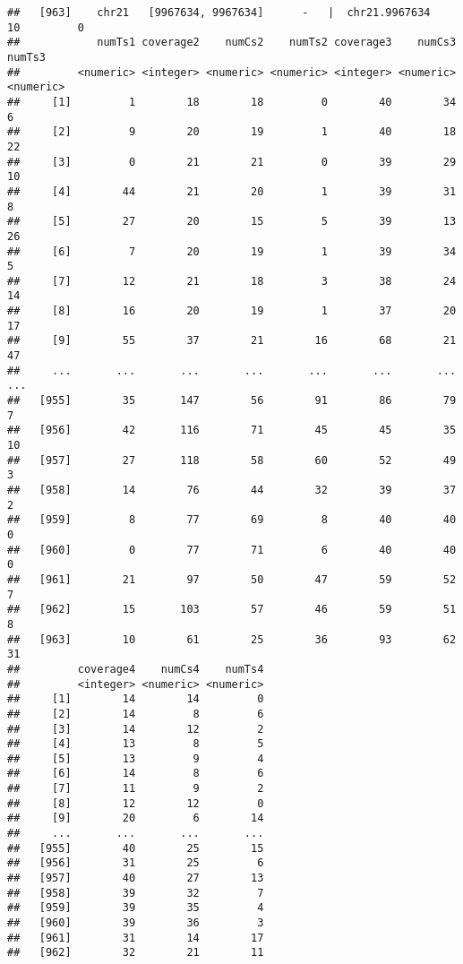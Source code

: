 \documentclass{article}
\makeatletter
\newenvironment{kframe}{%
 \def\FrameCommand##1{\hskip\@totalleftmargin \hskip-\fboxsep
 \colorbox{shadecolor}{##1}\hskip-\fboxsep
     \hskip-\linewidth \hskip-\@totalleftmargin \hskip\columnwidth}%
 \MakeFramed {\advance\hsize-\width
   \@totalleftmargin\z@ \linewidth\hsize
   \@setminipage}}%
 {\par\unskip\endMakeFramed}
\newenvironment{knitrout}{}{} %
\makeatother
\begin{document}
\begin{knitrout}
{\begin{kframe}
\begin{verbatim}
##   [963]    chr21   [9967634, 9967634]      -   |  chr21.9967634        10         0
##            numTs1 coverage2    numCs2    numTs2 coverage3    numCs3    numTs3
##         <numeric> <integer> <numeric> <numeric> <integer> <numeric> <numeric>
##     [1]         1        18        18         0        40        34         6
##     [2]         9        20        19         1        40        18        22
##     [3]         0        21        21         0        39        29        10
##     [4]        44        21        20         1        39        31         8
##     [5]        27        20        15         5        39        13        26
##     [6]         7        20        19         1        39        34         5
##     [7]        12        21        18         3        38        24        14
##     [8]        16        20        19         1        37        20        17
##     [9]        55        37        21        16        68        21        47
##     ...       ...       ...       ...       ...       ...       ...       ...
##   [955]        35       147        56        91        86        79         7
##   [956]        42       116        71        45        45        35        10
##   [957]        27       118        58        60        52        49         3
##   [958]        14        76        44        32        39        37         2
##   [959]         8        77        69         8        40        40         0
##   [960]         0        77        71         6        40        40         0
##   [961]        21        97        50        47        59        52         7
##   [962]        15       103        57        46        59        51         8
##   [963]        10        61        25        36        93        62        31
##         coverage4    numCs4    numTs4
##         <integer> <numeric> <numeric>
##     [1]        14        14         0
##     [2]        14         8         6
##     [3]        14        12         2
##     [4]        13         8         5
##     [5]        13         9         4
##     [6]        14         8         6
##     [7]        11         9         2
##     [8]        12        12         0
##     [9]        20         6        14
##     ...       ...       ...       ...
##   [955]        40        25        15
##   [956]        31        25         6
##   [957]        40        27        13
##   [958]        39        32         7
##   [959]        39        35         4
##   [960]        39        36         3
##   [961]        31        14        17
##   [962]        32        21        11

\end{verbatim}
\end{kframe}}
\end{knitrout}
\end{document}
